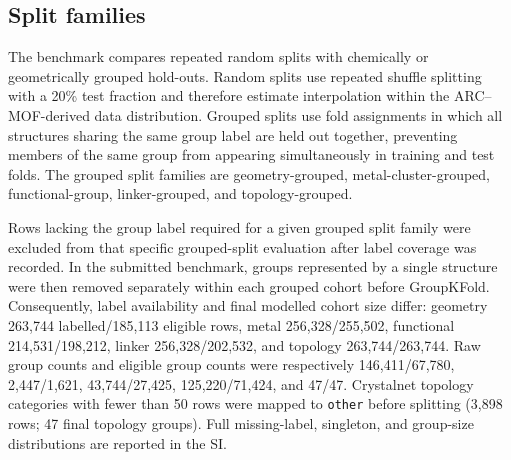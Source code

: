 \documentclass[11pt,a4paper]{article}
\begin{document}
\subsection*{Split families}
The benchmark compares repeated random splits with chemically or geometrically grouped hold-outs. Random splits use repeated shuffle splitting with a 20\% test fraction and therefore estimate interpolation within the ARC--MOF-derived data distribution. Grouped splits use fold assignments in which all structures sharing the same group label are held out together, preventing members of the same group from appearing simultaneously in training and test folds. The grouped split families are geometry-grouped, metal-cluster-grouped, functional-group, linker-grouped, and topology-grouped. 

Rows lacking the group label required for a given grouped split family were excluded from that specific grouped-split evaluation after label coverage was recorded. In the submitted benchmark, groups represented by a single structure were then removed separately within each grouped cohort before GroupKFold. Consequently, label availability and final modelled cohort size differ: geometry 263,744 labelled/185,113 eligible rows, metal 256,328/255,502, functional 214,531/198,212, linker 256,328/202,532, and topology 263,744/263,744. Raw group counts and eligible group counts were respectively 146,411/67,780, 2,447/1,621, 43,744/27,425, 125,220/71,424, and 47/47. Crystalnet topology categories with fewer than 50 rows were mapped to \texttt{other} before splitting (3,898 rows; 47 final topology groups). Full missing-label, singleton, and group-size distributions are reported in the SI.
\end{document}

